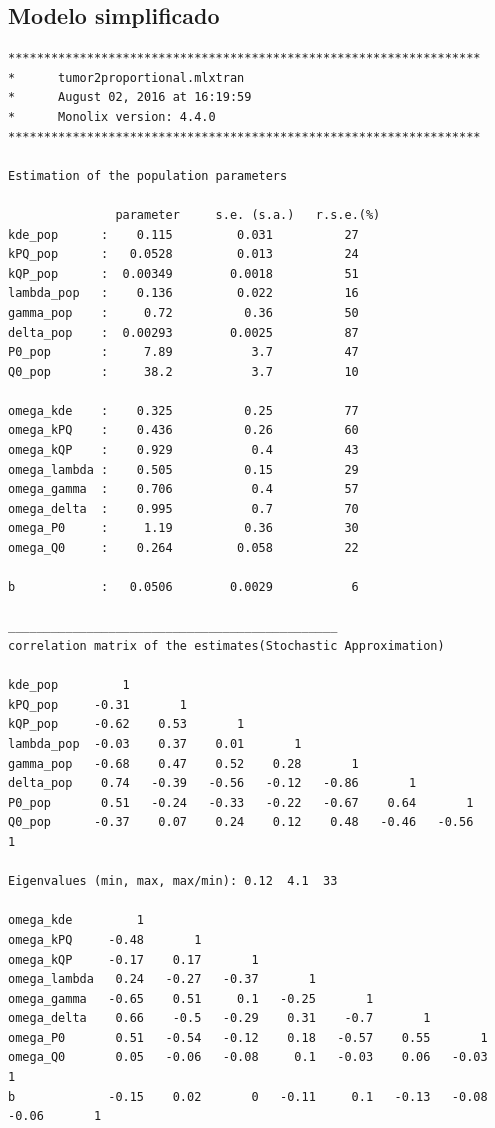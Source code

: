 \documentclass[letterpaper,12pt]{article}
\theoremstyle{definition} \newtheorem{Def}{Definición}[section]
\theoremstyle{definition} \newtheorem{Teo}{Teorema}[section]
\theoremstyle{definition} \newtheorem{Pro}{Proposición}
\theoremstyle{definition} \newtheorem{Lema}{Lema}[section]
\theoremstyle{definition} \newtheorem{Cor}{Corolario}[section]
\begin{document}
\subsection{Modelo simplificado}
\begin{verbatim}
******************************************************************
*      tumor2proportional.mlxtran
*      August 02, 2016 at 16:19:59
*      Monolix version: 4.4.0
******************************************************************

Estimation of the population parameters

               parameter     s.e. (s.a.)   r.s.e.(%) 
kde_pop      :    0.115         0.031          27    
kPQ_pop      :   0.0528         0.013          24    
kQP_pop      :  0.00349        0.0018          51    
lambda_pop   :    0.136         0.022          16    
gamma_pop    :     0.72          0.36          50    
delta_pop    :  0.00293        0.0025          87    
P0_pop       :     7.89           3.7          47    
Q0_pop       :     38.2           3.7          10    

omega_kde    :    0.325          0.25          77    
omega_kPQ    :    0.436          0.26          60    
omega_kQP    :    0.929           0.4          43    
omega_lambda :    0.505          0.15          29    
omega_gamma  :    0.706           0.4          57    
omega_delta  :    0.995           0.7          70    
omega_P0     :     1.19          0.36          30    
omega_Q0     :    0.264         0.058          22    

b            :   0.0506        0.0029           6    

______________________________________________
correlation matrix of the estimates(Stochastic Approximation)

kde_pop         1                      
kPQ_pop     -0.31       1                   
kQP_pop     -0.62    0.53       1                
lambda_pop  -0.03    0.37    0.01       1             
gamma_pop   -0.68    0.47    0.52    0.28       1          
delta_pop    0.74   -0.39   -0.56   -0.12   -0.86       1       
P0_pop       0.51   -0.24   -0.33   -0.22   -0.67    0.64       1    
Q0_pop      -0.37    0.07    0.24    0.12    0.48   -0.46   -0.56       1 

Eigenvalues (min, max, max/min): 0.12  4.1  33

omega_kde         1                         
omega_kPQ     -0.48       1                      
omega_kQP     -0.17    0.17       1                   
omega_lambda   0.24   -0.27   -0.37       1                
omega_gamma   -0.65    0.51     0.1   -0.25       1             
omega_delta    0.66    -0.5   -0.29    0.31    -0.7       1          
omega_P0       0.51   -0.54   -0.12    0.18   -0.57    0.55       1       
omega_Q0       0.05   -0.06   -0.08     0.1   -0.03    0.06   -0.03       1    
b             -0.15    0.02       0   -0.11     0.1   -0.13   -0.08   -0.06       1 


\end{verbatim}
\end{document}
